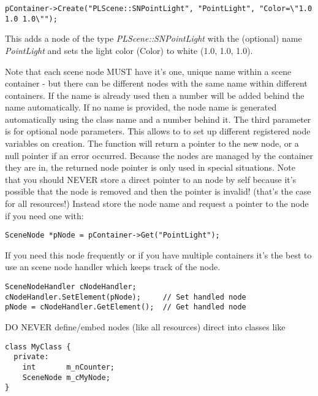 \begin{lstlisting}[caption=Creating a new scene node instance]
pContainer->Create("PLScene::SNPointLight", "PointLight", "Color=\"1.0 1.0 1.0\"");
\end{lstlisting}

This adds a node of the type \emph{PLScene::SNPointLight} with the (optional) name \emph{PointLight} and sets the light color (Color) to white (1.0, 1.0, 1.0).

Note that each scene node MUST have it's one, unique name within a scene container - but there can be different nodes with the same name within different containers. If the name is already used then a number will be added behind the name automatically. If no name is provided, the node name is generated automatically using the class name and a number behind it. The third parameter is for optional node parameters. This allows to to set up different registered node variables on creation. The function will return a pointer to the new node, or a null pointer if an error occurred. Because the nodes are managed by the container they are in, the returned node pointer is only used in special situations. Note that you should NEVER store a direct pointer to an node by self because it's possible that the node is removed and then the pointer is invalid! (that's the case for all resources!) Instead store the node name and request a pointer to the node if you need one with:

\begin{lstlisting}[caption=Requesting a scene node by name]
SceneNode *pNode = pContainer->Get("PointLight");
\end{lstlisting}

If you need this node frequently or if you have multiple containers it's the best to use an scene node handler which keeps track of the node.

\begin{lstlisting}[caption=Scene node handler]
SceneNodeHandler cNodeHandler;
cNodeHandler.SetElement(pNode);     // Set handled node
pNode = cNodeHandler.GetElement();  // Get handled node
\end{lstlisting}

DO NEVER define/embed nodes (like all resources) direct into classes like

\begin{lstlisting}[caption=Invalid scene node instance usage]
class MyClass {
  private:
    int       m_nCounter;
    SceneNode m_cMyNode;
}
\end{lstlisting}


